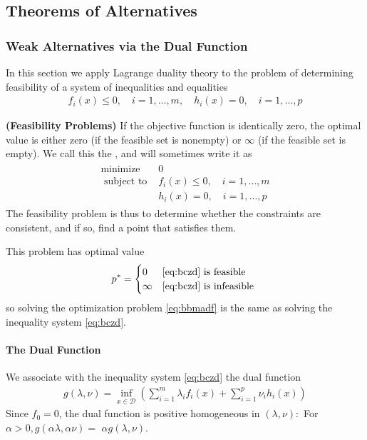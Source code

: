 \documentclass{article}
\newcommand{\bfs}[1]{\textbf{({#1}) }}
\begin{document}
\subsection{Theorems of Alternatives}
\subsubsection{ Weak Alternatives via the Dual Function}
In this section we apply Lagrange duality theory to the problem of determining feasibility of a system of inequalities and equalities
\begin{align}
f_{i}(x) \leq 0, \quad i=1, \ldots, m, \quad h_{i}(x)=0, \quad i=1, \ldots, p\label{eq:bczd}
\end{align}
\begin{defa}\bfs{Feasibility Problems}\label{def:zgdsf}
If the objective function is identically zero, the optimal value is either zero (if the feasible set is nonempty) or $\infty$ (if the feasible set is empty). We call this the , and will sometimes write it as
\begin{align}
\begin{array}{ll}
\operatorname{minimize}  & 0 \\
\text { subject to } & f_{i}(x) \leq 0, \quad i=1, \ldots, m \\
& h_{i}(x)=0, \quad i=1, \ldots, p
\end{array}\label{eq:bbmadf}
\end{align}
The feasibility problem is thus to determine whether the constraints are consistent, and if so, find a point that satisfies them.
\end{defa}

This problem has optimal value
\begin{align}
p^{* }= \begin{cases}0 & \cref{eq:bczd} \text { is feasible } \\ \infty & \cref{eq:bczd} \text { is infeasible }\end{cases}\label{eq:fgfda}
\end{align}
so solving the optimization problem \cref{eq:bbmadf} is the same as solving the inequality system \cref{eq:bczd}.
\paragraph{The Dual Function}
We associate with the inequality system \cref{eq:bczd} the dual function
\begin{align*}
g(\lambda, \nu)=\inf _{x \in \mathcal{D}}\left(\sum_{i=1}^{m} \lambda_{i} f_{i}(x)+\sum_{i=1}^{p} \nu_{i} h_{i}(x)\right)
\end{align*}
Since $f_{0}=0$, the dual function is positive homogeneous in $(\lambda, \nu):$ For $\alpha>0, g(\alpha \lambda, \alpha \nu)=$ $\alpha g(\lambda, \nu)$.
\end{document}
